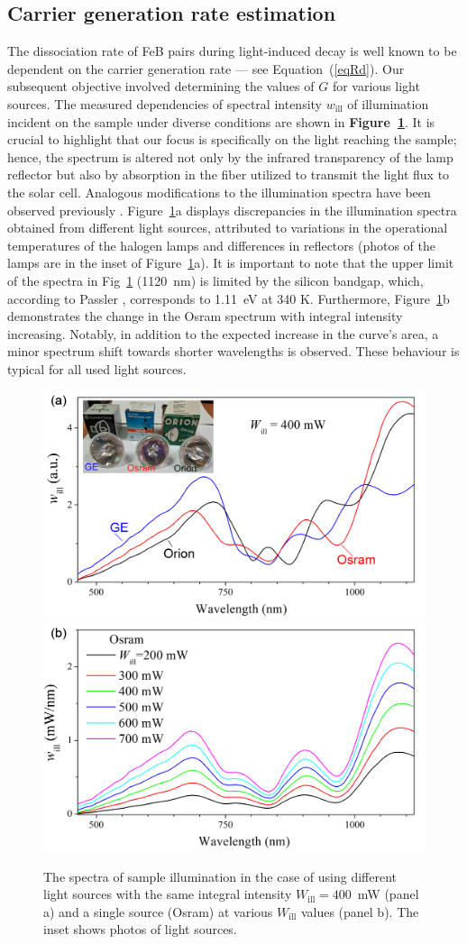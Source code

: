 \documentclass{WileyMSP-template}
\begin{document}
\subsection{Carrier generation rate estimation}\label{SecG}

The dissociation rate of FeB pairs during light-induced decay is well known
to be dependent on the carrier generation rate --- see Equation~(\ref{eqRd}).
Our subsequent objective involved determining the values of $G$ for various light sources.
The measured dependencies of spectral intensity $w_\mathrm{ill}$ of illumination incident on the sample under diverse conditions
are shown in \textbf{Figure~\ref{fig4}}.
It is crucial to highlight that our focus is specifically on the light reaching the sample;
hence, the spectrum is altered not only by the infrared transparency of the lamp reflector but also by absorption in the fiber
utilized to transmit the light flux to the solar cell.
Analogous modifications to the illumination spectra have been observed previously \cite{Libra2017}.
Figure~\ref{fig4}a displays discrepancies in the illumination spectra obtained from different light sources,
attributed to variations in the operational temperatures of the halogen lamps and differences in reflectors
(photos of the lamps are in the inset of Figure~\ref{fig4}a).
It is important to note that the upper limit of the spectra in Fig~\ref{fig4} (1120~nm)
is limited by the silicon bandgap, which, according to Passler \cite{Pasler}, corresponds to 1.11~eV at 340 K.
Furthermore, Figure~\ref{fig4}b demonstrates the change in the Osram spectrum with integral intensity increasing.
Notably, in addition to the expected increase in the curve's area, a minor spectrum shift towards shorter wavelengths is observed.
These behaviour is typical for all used light sources.



\begin{figure}
\centering
  \includegraphics[width=0.4\linewidth]{Fig4a.png}
  \includegraphics[width=0.4\linewidth]{Fig4b.png}
  \caption{
  The spectra of sample illumination in the case of using different light sources
  with the same integral intensity $W_\mathrm{ill}=400$~mW (panel a) and a single source (Osram)
 at various $W_\mathrm{ill}$ values (panel b).
 The inset shows photos of light sources.
}
  \label{fig4}
\end{figure}
\end{document}
